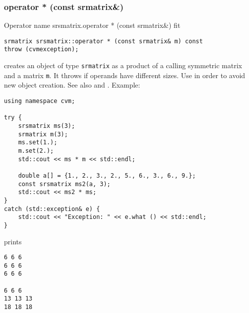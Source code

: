 \subsubsection{operator * (const srmatrix\&)}
Operator%
\pdfdest name {srsmatrix.operator * (const srmatrix&)} fit
\begin{verbatim}
srmatrix srsmatrix::operator * (const srmatrix& m) const
throw (cvmexception);
\end{verbatim}
creates an object of type \verb"srmatrix"
as a product of a calling symmetric matrix and a matrix \verb"m".
It throws  
if  operands have different sizes.
Use  in order to avoid
 new object creation.
See also
 and .
Example:
\begin{Verbatim}
using namespace cvm;

try {
    srsmatrix ms(3);
    srmatrix m(3);
    ms.set(1.);
    m.set(2.);
    std::cout << ms * m << std::endl;

    double a[] = {1., 2., 3., 2., 5., 6., 3., 6., 9.};
    const srsmatrix ms2(a, 3);
    std::cout << ms2 * ms;
}
catch (std::exception& e) {
    std::cout << "Exception: " << e.what () << std::endl;
}
\end{Verbatim}
prints
\begin{Verbatim}
6 6 6
6 6 6
6 6 6

6 6 6
13 13 13
18 18 18
\end{Verbatim}
\newpage





